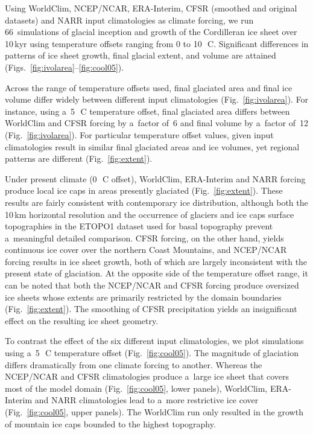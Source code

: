 \documentclass[tc, ms]{copernicus}
\begin{document}
Using WorldClim, NCEP/NCAR, ERA-Interim, CFSR (smoothed and original datasets) and NARR input climatologies as climate forcing, we run 66~simulations of glacial inception and growth of the Cordilleran ice sheet over 10\,kyr using temperature offsets ranging from 0 to 10\,\unit{{\degree}C}. Significant differences in patterns of ice sheet growth, final glacial extent, and volume are attained (Figs.~\ref{fig:ivolarea}--\ref{fig:cool05}).

Across the range of temperature offsets used, final glaciated area and final ice volume differ widely between different input climatologies (Fig.~\ref{fig:ivolarea}). For instance, using a~5\,\unit{{\degree}C} temperature offset, final glaciated area differs between WorldClim and CFSR forcing by a~factor of~6 and final volume by a~factor of~12 (Fig.~\ref{fig:ivolarea}). For particular temperature offset values, given input climatologies result in similar final glaciated areas and ice volumes, yet regional patterns are different (Fig.~\ref{fig:extent}).

Under present climate (0\,\unit{{\degree}C} offset), WorldClim, ERA-Interim and NARR forcing produce local ice caps in areas presently glaciated (Fig.~\ref{fig:extent}). These results are fairly consistent with contemporary ice distribution, although both the 10\,\unit{km} horizontal resolution and the occurrence of glaciers and ice caps surface topographies in the ETOPO1 dataset used for basal topography prevent a~meaningful detailed comparison. CFSR forcing, on the other hand, yields continuous ice cover over the northern Coast Mountains, and NCEP/NCAR forcing results in ice sheet growth, both of which are largely inconsistent with the present state of glaciation. At the opposite side of the temperature offset range, it can be noted that both the NCEP/NCAR and CFSR forcing produce oversized ice sheets whose extents are primarily restricted by the domain boundaries (Fig.~\ref{fig:extent}). The smoothing of CFSR precipitation yields an insignificant effect on the resulting ice sheet geometry.

To contrast the effect of the six different input climatologies, we plot simulations using a~5\,\unit{{\degree}C} temperature offset (Fig.~\ref{fig:cool05}). The magnitude of glaciation differs dramatically from one climate forcing to another. Whereas the NCEP/NCAR and CFSR climatologies produce a~large ice sheet that covers most of the model domain (Fig.~\ref{fig:cool05}, lower panels), WorldClim, ERA-Interim and NARR climatologies lead to a~more restrictive ice cover (Fig.~\ref{fig:cool05}, upper panels). The WorldClim run only resulted in the growth of mountain ice caps bounded to the highest topography.
\end{document}
